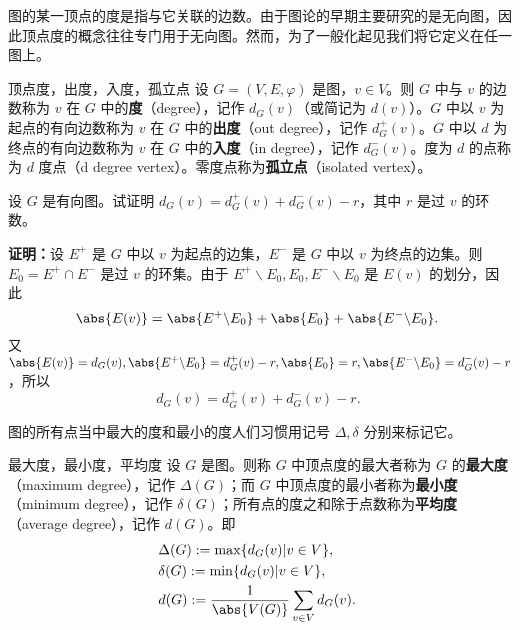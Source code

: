 

图的某一顶点的度是指与它关联的边数。由于图论的早期主要研究的是无向图，因此顶点度的概念往往专门用于无向图。然而，为了一般化起见我们将它定义在任一图上。

\begin{definition}{顶点度，出度，入度，孤立点}
设 $G=(V,E,\varphi)$ 是图，$v\in V$。则 $G$ 中与 $v$ 的边数称为 $v$ 在 $G$ 中的\textbf{度}（degree），记作 $d_G(v)$（或简记为 $d(v)$）。$G$ 中以 $v$ 为起点的有向边数称为 $v$ 在 $G$ 中的\textbf{出度}（out degree），记作 $d_G^+(v)$。$G$ 中以 $d$ 为终点的有向边数称为 $v$ 在 $G$ 中的\textbf{入度}（in degree），记作 $d_G^-(v)$。度为 $d$ 的点称为 $d$ 度点（d degree vertex）。零度点称为\textbf{孤立点}（isolated vertex）。
\end{definition}

\begin{example}{}
设 $G$ 是有向图。试证明 $d_G(v)=d_G^+(v)+d_G^-(v)-r$，其中 $r$ 是过 $v$ 的环数。

\textbf{证明：}设 $E^+$ 是 $G$ 中以 $v$ 为起点的边集，$E^-$ 是 $G$ 中以 $v$ 为终点的边集。则 $E_0=E^+\cap E^-$ 是过 $v$ 的环集。由于
$E^+\backslash E_0, E_0, E^-\backslash E_0$ 是 $E(v)$ 的划分，因此
\begin{equation}
\abs{E(v)}=\abs{E^+\backslash E_0}+\abs{E_0}+\abs{E^-\backslash E_0}.~
\end{equation}
又 $\abs{E(v)}=d_G(v),\abs{E^+\backslash E_0}=d_G^+(v)-r, \abs{E_0}=r, \abs{E^-\backslash E_0}=d_G^-(v)-r$，所以
\begin{equation}
d_G(v)=d_G^+(v)+d_G^-(v)-r.~
\end{equation}
\end{example}
图的所有点当中最大的度和最小的度人们习惯用记号 $\Delta,\delta$ 分别来标记它。
\begin{definition}{最大度，最小度，平均度}
设 $G$ 是图。则称 $G$ 中顶点度的最大者称为 $G$ 的\textbf{最大度}（maximum degree），记作 $\Delta(G)$；而 $G$ 中顶点度的最小者称为\textbf{最小度}（minimum degree），记作 $\delta(G)$；所有点的度之和除于点数称为\textbf{平均度}（average degree），记作 $d(G)$。即
\begin{equation}
\begin{aligned}
&\Delta(G):=\max\{d_G(v)|v\in V\}, \\
&\delta(G):=\min\{d_G(v)|v\in V\},\\
&d(G):=\frac{1}{\abs{V(G)}}\sum_{v\in V}d_G(v).
\end{aligned}~
\end{equation}
\end{definition}

